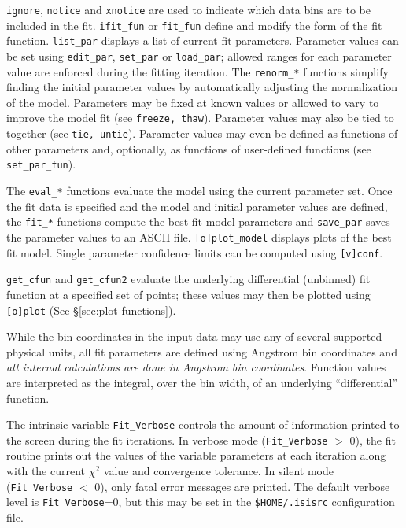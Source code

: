 \documentclass{book}
\begin{document}
{{\tt ignore}, {\tt notice} and {\tt xnotice} are used to indicate
which data bins are to be included in the fit. {\tt ifit\_fun} or
{\tt fit\_fun} define and modify the form of the fit function.
{\tt list\_par} displays a list of current fit parameters.
Parameter values can be set using {\tt edit\_par}, {\tt set\_par}
or {\tt load\_par}; allowed ranges for each parameter value are
enforced during the fitting iteration. The {\tt renorm\_*}
functions simplify finding the initial parameter values by
automatically adjusting the normalization of the model. Parameters
may be fixed at known values or allowed to vary to improve the
model fit (see {\tt freeze, thaw}). Parameter values may also be
tied to together (see {\tt tie, untie}). Parameter values may even
be defined as functions of other parameters and, optionally, as
functions of user-defined functions (see \verb|set_par_fun|).

The {\tt eval\_*} functions evaluate the model using the current
parameter set. Once the fit data is specified and the model and
initial parameter values are defined, the {\tt fit\_*} functions
compute the best fit model parameters and {\tt save\_par} saves
the parameter values to an ASCII file. {\tt [o]plot\_model}
displays plots of the best fit model. Single parameter confidence
limits can be computed using {\tt [v]conf}.

{\tt get\_cfun} and {\tt get\_cfun2} evaluate the underlying
differential (unbinned) fit function at a specified set of
points; these values may then be plotted using {\tt [o]plot}
(See \S \ref{sec:plot-functions}).

While the bin coordinates in the input data may use any of several
supported physical units, all fit parameters are defined using
Angstrom bin coordinates and {\it all internal calculations are
done in Angstrom bin coordinates}.  Function values are
interpreted as the integral, over the bin width, of an underlying
``differential'' function.

The intrinsic variable {\tt Fit\_Verbose} controls the amount of
information printed to the screen during the fit iterations. In
verbose mode ({\tt Fit\_Verbose} $>$ 0), the fit routine prints out
the values of the variable parameters at each iteration along with
the current $\chi^2$ value and convergence tolerance. In silent
mode ({\tt Fit\_Verbose} $<$ 0), only fatal error messages are
printed. The default verbose level is {\tt Fit\_Verbose}=0, but
this may be set in the {\tt \$HOME/.isisrc} configuration file.

}
\end{document}
